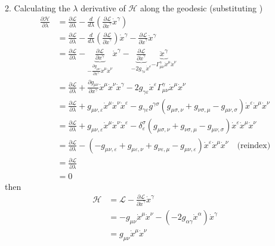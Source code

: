 \documentclass[10pt,a4paper]{article}
\theoremstyle{definition}
\begin{document}
2. Calculating the $\lambda$ derivative of $\mathcal{H}$ along the geodesic (substituting )
\begin{align}
\frac{\partial\mathcal{H}}{\partial\lambda}&=\frac{\partial\mathcal{L}}{\partial\lambda}-\frac{d}{d\lambda}\left(\frac{\partial\mathcal{L}}{\partial\dot{x}^\gamma}\dot{x}^\gamma\right)\\
&=\frac{\partial\mathcal{L}}{\partial\lambda}-\frac{d}{d\lambda}\left(\frac{\partial\mathcal{L}}{\partial\dot{x}^\gamma}\right)\dot{x}^\gamma-\frac{\partial\mathcal{L}}{\partial\dot{x}^\gamma}\ddot{x}^\gamma\\
&=\frac{\partial\mathcal{L}}{\partial\lambda}-\underbrace{\frac{\partial\mathcal{L}}{\partial x^\gamma}}_{-\frac{\partial g_{\mu\nu}}{\partial x^\gamma}\dot{x}^\mu\dot{x}^\nu}\dot{x}^\gamma
-\underbrace{\frac{\partial\mathcal{L}}{\partial\dot{x}^\gamma}}_{-2g_{\gamma\varepsilon}\dot{x}^\varepsilon}\underbrace{\ddot{x}^\gamma}_{-\Gamma^\gamma_{\mu\nu}\dot{x}^\mu\dot{x}^\nu}\\
&=\frac{\partial\mathcal{L}}{\partial\lambda}+\frac{\partial g_{\mu\nu}}{\partial x^\gamma}\dot{x}^\mu\dot{x}^\nu\dot{x}^\gamma-2g_{\gamma\varepsilon}\dot{x}^\varepsilon \Gamma^\gamma_{\mu\nu}\dot{x}^\mu\dot{x}^\nu\\
&=\frac{\partial\mathcal{L}}{\partial\lambda}+g_{\mu\nu,\varepsilon}\dot{x}^\mu\dot{x}^\nu\dot{x}^\varepsilon-g_{\gamma\varepsilon}g^{\gamma\sigma}(g_{\mu\sigma,\nu}+g_{\nu\sigma,\mu}-g_{\mu\nu,\sigma})\dot{x}^\varepsilon \dot{x}^\mu\dot{x}^\nu\\
&=\frac{\partial\mathcal{L}}{\partial\lambda}+g_{\mu\nu,\varepsilon}\dot{x}^\mu\dot{x}^\nu\dot{x}^\varepsilon-\delta_\varepsilon^\sigma(g_{\mu\sigma,\nu}+g_{\nu\sigma,\mu}-g_{\mu\nu,\sigma})\dot{x}^\varepsilon \dot{x}^\mu\dot{x}^\nu\\
&=\frac{\partial\mathcal{L}}{\partial\lambda}-(-g_{\mu\nu,\varepsilon}+g_{\mu\varepsilon,\nu}+g_{\nu\varepsilon,\mu}-g_{\mu\nu,\varepsilon})\dot{x}^\varepsilon \dot{x}^\mu\dot{x}^\nu\quad\text{(reindex)}\\
&=\frac{\partial\mathcal{L}}{\partial\lambda}\\
&=0
\end{align}
then
\begin{align}
\mathcal{H}&=\mathcal{L}-\frac{\partial\mathcal{L}}{\partial\dot{x}^\gamma}\dot{x}^\gamma\\
&=-g_{\mu\nu}\dot{x}^\mu\dot{x}^\nu-(-2g_{\alpha\gamma}\dot{x}^\alpha)\dot{x}^\gamma\\
&=g_{\mu\nu}\dot{x}^\mu\dot{x}^\nu
\end{align}
\end{document}
